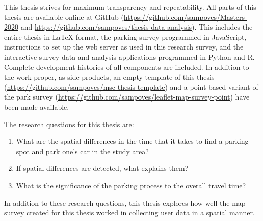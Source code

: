 This thesis strives for maximum transparency and repeatability. All parts of this thesis are available online at GitHub (\textcolor{blue}{\url{https://github.com/sampoves/Masters-2020}} and \textcolor{blue}{\url{https://github.com/sampoves/thesis-data-analysis}}). This includes the entire thesis in LaTeX format, the parking survey programmed in JavaScript, instructions to set up the web server as used in this research survey, and the interactive survey data and analysis applications programmed in Python and R. Complete development histories of all components are included. In addition to the work proper, as side products, an empty template of this thesis (\textcolor{blue}{\url{https://github.com/sampoves/msc-thesis-template}}) and a point based variant of the park survey (\textcolor{blue}{\url{https://github.com/sampoves/leaflet-map-survey-point}}) have been made available.

\bigskip
\begin{samepage}
    \noindent
    The research questions for this thesis are:
    
    \begin{spacing}{1}
        \begin{enumerate}[label=\Roman*]
          \item What are the spatial differences in the time that it takes to find a parking spot and park one’s car in the study area?
          \item If spatial differences are detected, what explains them?
          \item What is the significance of the parking process to the overall travel time?
        \end{enumerate}
    \end{spacing}
    \bigskip
    In addition to these research questions, this thesis explores how well the map survey created for this thesis worked in collecting user data in a spatial manner.
\end{samepage}